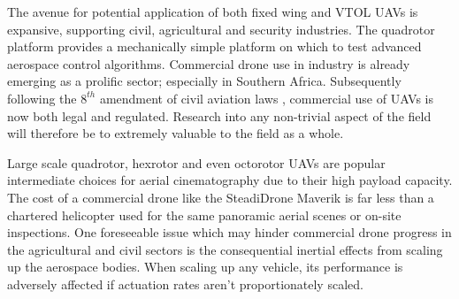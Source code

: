 \par
The avenue for potential application of both fixed wing and VTOL UAVs is expansive, supporting civil\cite{civilquadcopter}, agricultural\cite{agriculturequadcopter} and security\cite{videosurveillancequadcopter} industries. The quadrotor platform provides a mechanically simple platform on which to test advanced aerospace control algorithms. Commercial drone use in industry is already emerging as a prolific sector; especially in Southern Africa. Subsequently following the $8^{th}$ amendment of civil aviation laws \cite{dronelaw}, commercial use of UAVs is now both legal and regulated. Research into any non-trivial aspect of the field will therefore be to extremely valuable to the field as a whole. 
\par
Large scale quadrotor, hexrotor and even octorotor UAVs are popular intermediate choices for aerial cinematography due to their high payload capacity.  The cost of a commercial drone like the SteadiDrone Maverik \cite{steadidrone} is far less than a chartered helicopter used for the same panoramic aerial scenes or on-site inspections. One foreseeable issue which may hinder commercial drone progress in the agricultural and civil sectors is the consequential inertial effects from scaling up the aerospace bodies. When scaling up any vehicle, its performance is adversely affected if actuation rates aren't proportionately scaled.
